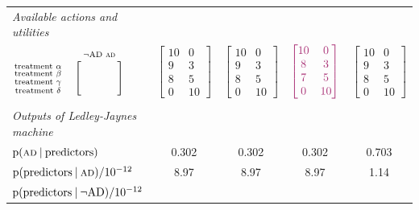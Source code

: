 \documentclass[utf8]{FrontiersinHarvard} %
\newcommand*{\p}{\mathrm{p}}%
\renewcommand*{\|}[1][]{\nonscript\:#1\vert\nonscript\:\mathopen{}}
\newcommand*{\ljm}{Ledley-Jaynes machine}
\newcommand*{\AD}{\textsc{ad}}
\newcommand*{\nAD}{\lnot\mathrm{AD}}
\begin{document}
\begin{table}[!t]
\begin{tabular}{lcccc}
    \emph{\small Available actions and utilities}&&&& \\[\jot]
    $
    \begin{matrix}
      &\begin{smallmatrix}\nAD&\AD\end{smallmatrix}\\
      \begin{smallmatrix}
      \text{treatment $\alpha$}\\
      \text{treatment $\beta$}\\
      \text{treatment $\gamma$}\\
      \text{treatment $\delta$}
    \end{smallmatrix}&
    \Biggl[\begin{smallmatrix}
      \hphantom{\nAD}&\hphantom{\AD}\\&\\&\\&
    \end{smallmatrix}\Biggr]
    \end{matrix}$
    &
    $\begin{bmatrix}10&0\\9&3\\8&5\\0&10\end{bmatrix}$
    &
    $\begin{bmatrix}10&0\\9&3\\8&5\\0&10\end{bmatrix}$
    &
    $\color{redpurple}\begin{bmatrix}10&0\\8&3\\7&5\\0&10\end{bmatrix}$
    &
    $\begin{bmatrix}10&0\\9&3\\8&5\\0&10\end{bmatrix}$
    \\[4\jot] \hline\\
    \emph{\small Outputs of \ljm}&&&& \\[2\jot]
    {\small $\p(\AD \| \text{predictors})$}&
    0.302&0.302&0.302&0.703
    \\
    {\small $\p(\text{predictors} \| \AD)/10^{-12}$}&
    8.97&8.97&8.97&1.14
    \\
    {\small $\p(\text{predictors} \| \nAD)/10^{-12}$}&

\end{tabular}
\end{table}
\end{document}
